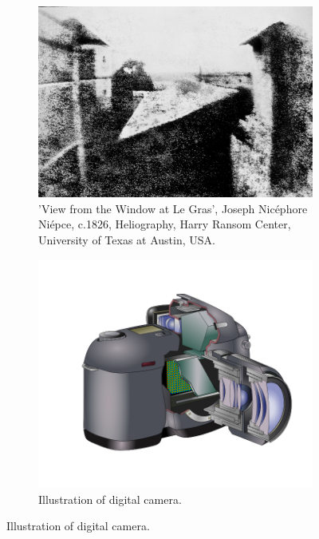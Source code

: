 \begin{figure}[ht]
    \centering
    \begin{subfigure}[t]{0.4\linewidth}
        \includegraphics[width=\linewidth]{Figures/FotoStoria.jpg}
        \caption{'View from the Window at Le Gras', Joseph Nicéphore Niépce, c.1826, Heliography, Harry Ransom Center, University of Texas at Austin, USA\cite{FirstPhoto}.}
    \end{subfigure}
    \hspace{2cm}
    \begin{subfigure}[t]{0.4\linewidth}
        \includegraphics[width=\linewidth]{Figures/digitalcamera.png}
        \caption{Illustration of digital camera\cite{Reflex}.}
    \end{subfigure}
\end{figure}

